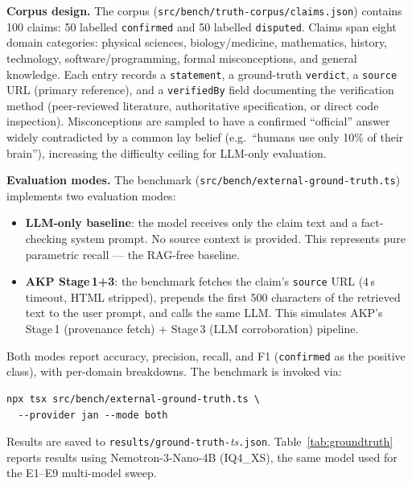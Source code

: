 \documentclass[10pt,twocolumn]{article}
\begin{document}
\textbf{Corpus design.} The corpus (\texttt{src/bench/truth-corpus/claims.json})
contains 100 claims: 50 labelled \texttt{confirmed} and 50 labelled
\texttt{disputed}. Claims span eight domain categories: physical
sciences, biology/medicine, mathematics, history, technology,
software/programming, formal misconceptions, and general knowledge. Each
entry records a \texttt{statement}, a ground-truth \texttt{verdict}, a
\texttt{source} URL (primary reference), and a \texttt{verifiedBy}
field documenting the verification method (peer-reviewed literature,
authoritative specification, or direct code inspection). Misconceptions
are sampled to have a confirmed ``official'' answer widely contradicted
by a common lay belief (e.g.\ ``humans use only 10\% of their brain''),
increasing the difficulty ceiling for LLM-only evaluation.

\textbf{Evaluation modes.} The benchmark (\texttt{src/bench/external-ground-truth.ts})
implements two evaluation modes:

\begin{itemize}[noitemsep,topsep=2pt]
  \item \textbf{LLM-only baseline}: the model receives only the claim text
        and a fact-checking system prompt. No source context is provided.
        This represents pure parametric recall — the RAG-free baseline.
  \item \textbf{AKP Stage\,1+3}: the benchmark fetches the claim's
        \texttt{source} URL (4\,s timeout, HTML stripped), prepends the
        first 500 characters of the retrieved text to the user prompt, and
        calls the same LLM. This simulates AKP's Stage\,1 (provenance
        fetch) + Stage\,3 (LLM corroboration) pipeline.
\end{itemize}

Both modes report accuracy, precision, recall, and F1 (\texttt{confirmed}
as the positive class), with per-domain breakdowns. The benchmark is
invoked via:

\begin{lstlisting}
npx tsx src/bench/external-ground-truth.ts \
  --provider jan --mode both
\end{lstlisting}

Results are saved to \texttt{results/ground-truth-}\textit{ts}\texttt{.json}.
Table~\ref{tab:groundtruth} reports results using Nemotron-3-Nano-4B
(IQ4\_XS), the same model used for the E1--E9 multi-model sweep.
\end{document}
